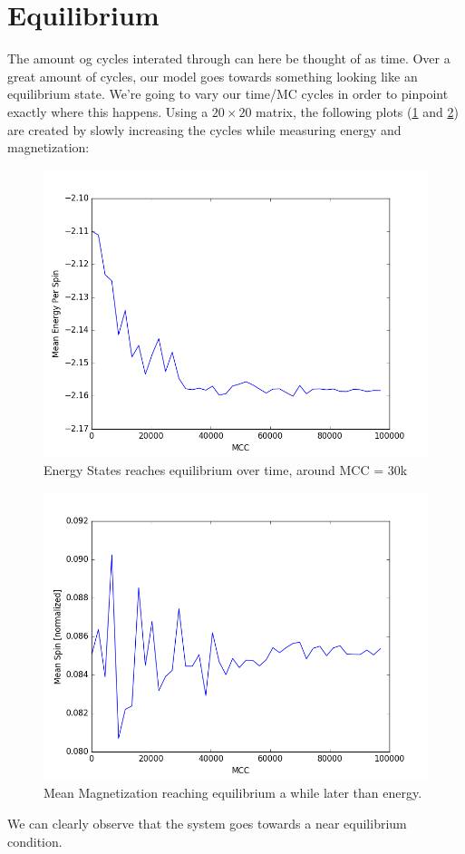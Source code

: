 \documentclass[%
oneside,                 %
final,                   %
10pt]{article}
\begin{document}
\section{Equilibrium}
The amount og cycles interated through can here be thought of as time.
Over a great amount of cycles, our model goes towards something looking like an equilibrium state.
We're going to vary our time/MC cycles in order to pinpoint exactly where this happens.
Using a $20\times20$ matrix, the following plots (\ref{1} and \ref{2}) are created by slowly increasing the cycles while measuring energy and magnetization:
\begin{figure}
 \includegraphics[scale=0.5]{1}
 \caption{Energy States reaches equilibrium over time, around MCC = 30k}
 \label{1}
 \end{figure}
\begin{figure}
 \includegraphics[scale=0.5]{2}
 \caption{Mean Magnetization reaching equilibrium a while later than energy.}
 \label{2}
\end{figure}
We can clearly observe that the system goes towards a near equilibrium condition.
\end{document}
